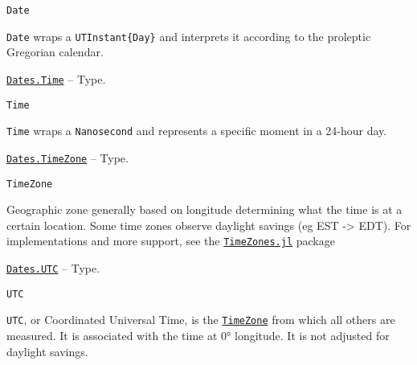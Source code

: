 \begin{adjustwidth}{2em}{0pt}


\begin{verbatim}
Date
\end{verbatim}

\texttt{Date} wraps a \texttt{UTInstant\{Day\}} and interprets it according to the proleptic Gregorian calendar.



\end{adjustwidth}
\hypertarget{8861990744010508981}{}
\hyperlink{8861990744010508981}{\texttt{Dates.Time}}  -- {Type.}

\begin{adjustwidth}{2em}{0pt}


\begin{verbatim}
Time
\end{verbatim}

\texttt{Time} wraps a \texttt{Nanosecond} and represents a specific moment in a 24-hour day.



\end{adjustwidth}
\hypertarget{9198273980721998062}{}
\hyperlink{9198273980721998062}{\texttt{Dates.TimeZone}}  -- {Type.}

\begin{adjustwidth}{2em}{0pt}


\begin{verbatim}
TimeZone
\end{verbatim}

Geographic zone generally based on longitude determining what the time is at a certain location. Some time zones observe daylight savings (eg EST -> EDT). For implementations and more support, see the \href{https://github.com/JuliaTime/TimeZones.jl}{\texttt{TimeZones.jl}} package



\end{adjustwidth}
\hypertarget{5818374682943079131}{}
\hyperlink{5818374682943079131}{\texttt{Dates.UTC}}  -- {Type.}

\begin{adjustwidth}{2em}{0pt}


\begin{verbatim}
UTC
\end{verbatim}

\texttt{UTC}, or Coordinated Universal Time, is the \hyperlink{9198273980721998062}{\texttt{TimeZone}} from which all others are measured. It is associated with the time at 0° longitude. It is not adjusted for daylight savings.



\end{adjustwidth}

